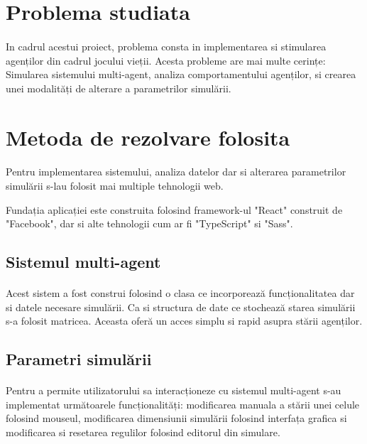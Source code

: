 \documentclass[11pt ,A4]{article}
\begin{document}
    \section{Problema studiata}

        \paragraph{}
        In cadrul acestui proiect, problema consta in implementarea si stimularea agenților din cadrul jocului vieții.
        Acesta probleme are mai multe cerințe: Simularea sistemului multi-agent, analiza comportamentului agenților, si crearea unei modalități de alterare a parametrilor simulării.
        

    \section{Metoda de rezolvare folosita}

        \paragraph{}
            Pentru implementarea sistemului, analiza datelor dar si alterarea parametrilor simulării s-lau folosit mai multiple tehnologii web.

            Fundația aplicației este construita folosind framework-ul "React" construit de "Facebook", dar si alte tehnologii cum ar fi "TypeScript" si "Sass".

        \subsection{Sistemul multi-agent}
            \paragraph{}
                Acest sistem a fost construi folosind o clasa ce incorporează funcționalitatea dar si datele necesare simulării.
                Ca si structura de date ce stochează starea simulării s-a folosit matricea. Aceasta oferă un acces simplu si rapid asupra stării agenților. 

        \subsection{Parametri simulării}
            \paragraph{}
                Pentru a permite utilizatorului sa interacționeze cu sistemul multi-agent s-au implementat următoarele funcționalități: modificarea manuala a stării unei celule folosind mouseul, modificarea dimensiunii simulării folosind interfața grafica si modificarea si resetarea regulilor folosind editorul din simulare.  
            
\end{document}

